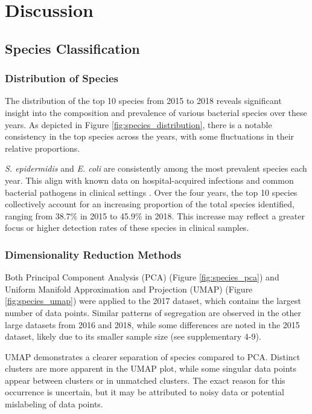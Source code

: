 \documentclass[english,11pt,a4paper,titlepage]{article}
\begin{document}
\section*{Discussion}
\subsection*{Species Classification}
\subsubsection*{Distribution of Species}
The distribution of the top 10 species from 2015 to 2018 reveals significant insight into the composition and prevalence of various bacterial species over these years. As depicted in Figure \ref{fig:species_distribution}, there is a notable consistency in the top species across the years, with some fluctuations in their relative proportions.

\textit{S. epidermidis} and \textit{E. coli} are consistently among the most prevalent species each year. This align with known data on hospital-acquired infections and common bacterial pathogens in clinical settings \cite{ottoStaphylococcusEpidermidisAccidental2009,russoMedicalEconomicImpact2003}. Over the four years, the top 10 species collectively account for an increasing proportion of the total species identified, ranging from 38.7\% in 2015 to 45.9\% in 2018. This increase may reflect a greater focus or higher detection rates of these species in clinical samples.

\subsubsection*{Dimensionality Reduction Methods}
Both Principal Component Analysis (PCA) (Figure \ref{fig:species_pca}) and Uniform Manifold Approximation and Projection (UMAP) (Figure \ref{fig:species_umap}) were applied to the 2017 dataset, which contains the largest number of data points. Similar patterns of segregation are observed in the other large datasets from 2016 and 2018, while some differences are noted in the 2015 dataset, likely due to its smaller sample size (see supplementary 4-9).

UMAP demonstrates a clearer separation of species compared to PCA. Distinct clusters are more apparent in the UMAP plot, while some singular data points appear between clusters or in unmatched clusters. The exact reason for this occurrence is uncertain, but it may be attributed to noisy data or potential mislabeling of data points.
\end{document}
